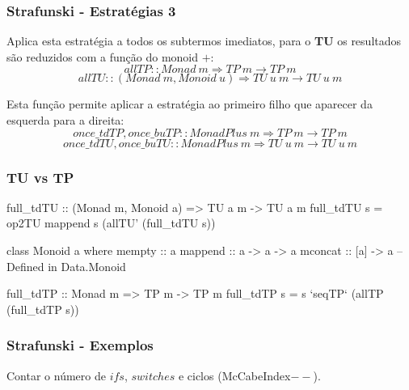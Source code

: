 \documentclass{beamer}
\begin{document}
\begin{frame} \frametitle{Strafunski - Estratégias 3}
Aplica esta estratégia a todos os subtermos imediatos, para o \textbf{TU} os resultados são reduzidos com a função do monoid $+$:
$$allTP :: Monad~m \Rightarrow TP~m \rightarrow TP~m$$
$$allTU :: (Monad~m, Monoid~u) \Rightarrow TU~u~m \rightarrow TU~u~m$$

Esta função permite aplicar a estratégia ao primeiro filho que aparecer da esquerda para a direita:
$$once\_tdTP,once\_buTP :: MonadPlus~m \Rightarrow TP~m \rightarrow TP~m$$
$$once\_tdTU, once\_buTU :: MonadPlus~m \Rightarrow TU~u~m \rightarrow TU~u~m$$
\end{frame}

\begin{frame}[fragile] \frametitle{TU vs TP}
\begin{haskell}
full_tdTU   :: (Monad m, Monoid a) => TU a m -> TU a m
full_tdTU s =  op2TU mappend s (allTU' (full_tdTU s))
\end{haskell}

\begin{haskell}
class Monoid a where
  mempty :: a
  mappend :: a -> a -> a
  mconcat :: [a] -> a
    -- Defined in Data.Monoid
\end{haskell}

\begin{haskell}
full_tdTP   :: Monad m => TP m -> TP m
full_tdTP s =  s `seqTP` (allTP (full_tdTP s))
\end{haskell}
\end{frame}

\begin{frame}[fragile] \frametitle{Strafunski - Exemplos}
Contar o número de $ifs$, $switches$ e ciclos (McCabeIndex$--$).
\end{frame}
\end{document}
